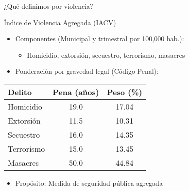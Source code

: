 \begin{frame}{¿Qué definimos por violencia?}
    \pause
    \begin{block}{Índice de Violencia Agregada (IACV)}
        \begin{itemize}
            \item Componentes (Municipal y trimestral por 100,000 hab.):
            \begin{itemize}
                \item Homicidio, extorsión, secuestro, terrorismo, masacres
            \end{itemize}
            \item Ponderación por gravedad legal (Código Penal):
        \end{itemize}
        
        \centering
        \begin{tabular}{lcc}
            \toprule
            \textbf{Delito} & \textbf{Pena (años)} & \textbf{Peso (\%)} \\
            \midrule
            Homicidio & 19.0 & 17.04 \\
            Extorsión & 11.5 & 10.31 \\
            Secuestro & 16.0 & 14.35 \\
            Terrorismo & 15.0 & 13.45 \\
            Masacres & 50.0 & 44.84 \\
            \midrule
            
            \bottomrule
        \end{tabular}
        \begin{itemize}
        \item \alert{Propósito}: Medida de seguridad pública agregada
        \end{itemize}
    \end{block}

\end{frame}

